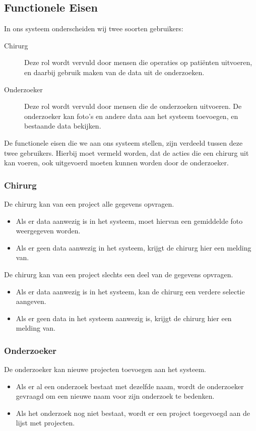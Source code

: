 \subsection{Functionele Eisen}
\label{functionele_eisen}
In ons systeem onderscheiden wij twee soorten gebruikers:
\begin{description}
	\item[Chirurg] Deze rol wordt vervuld door mensen die operaties op pati\"enten uitvoeren, en daarbij gebruik maken van de data uit de onderzoeken.
	\item[Onderzoeker] Deze rol wordt vervuld door mensen die de onderzoeken uitvoeren. De onderzoeker kan foto's en andere data aan het systeem toevoegen, en bestaande data bekijken.	
\end{description}
De functionele eisen die we aan ons systeem stellen, zijn verdeeld tussen deze twee gebruikers. Hierbij moet vermeld worden, dat de acties die een chirurg uit kan voeren, ook uitgevoerd moeten kunnen worden door de onderzoeker.
\subsubsection{Chirurg}

De chirurg kan van een project alle gegevens opvragen.
\begin{itemize}
	\item Als er data aanwezig is in het systeem, moet hiervan een gemiddelde foto weergegeven worden. 
	\item Als er geen data aanwezig in het systeem, krijgt de chirurg hier een melding van. 
\end{itemize}

De chirurg kan van een project slechts een deel van de gegevens opvragen.
\begin{itemize}
	\item Als er data aanwezig is in het systeem, kan de chirurg een verdere selectie aangeven.
	\item Als er geen data in het systeem aanwezig is, krijgt de chirurg hier een melding van.
\end{itemize}

\subsubsection{Onderzoeker}

De onderzoeker kan nieuwe projecten toevoegen aan het systeem.
\begin{itemize}
	\item Als er al een onderzoek bestaat met dezelfde naam, wordt de onderzoeker gevraagd om een nieuwe naam voor zijn onderzoek te bedenken.
	\item Als het onderzoek nog niet bestaat, wordt er een project toegevoegd aan de lijst met projecten.
\end{itemize}

